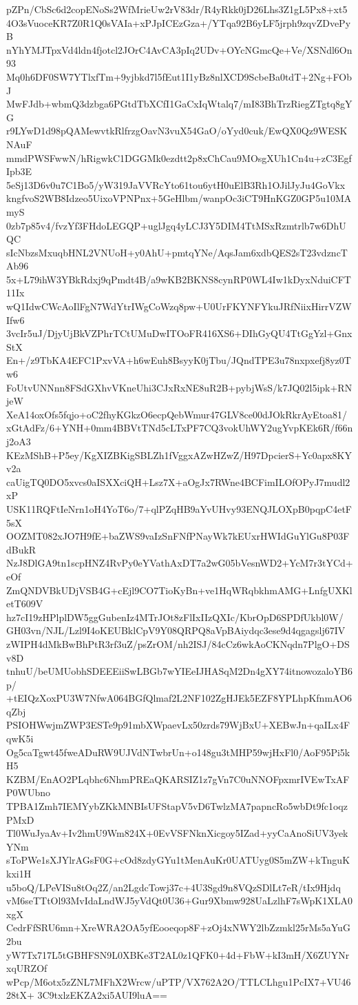 pZPn/CbSc6d2copENoSs2WfMrieUw2rV83dr/R4yRkk0jD26Lhs3Z1gL5Px8+xt5
4O3sVuoceKR7Z0R1Q0sVAIa+xPJpICEzGza+/YTqa92B6yLF5jrph9zqvZDvePyB
nYhYMJTpxVd4ldn4fjotcl2JOrC4AvCA3pIq2UDv+OYcNGmcQe+Ve/XSNdl6On93
Mq0h6DF0SW7YTlxfTm+9yjbkd7l5fEut1I1yBz8nlXCD9ScbeBa0tdT+2Ng+FObJ
MwFJdb+wbmQ3dzbga6PGtdTbXCfI1GaCxIqWtalq7/mI83BhTrzRiegZTgtq8gYG
r9LYwD1d98pQAMewvtkRlfrzgOavN3vuX54GaO/oYyd0cuk/EwQX0Qz9WESKNAuF
mmdPWSFwwN/hRigwkC1DGGMk0ezdtt2p8xChCau9MOsgXUh1Cn4u+zC3EgfIpb3E
5eSj13D6v0u7C1Bo5/yW319JaVVRcYto61tou6ytH0uElB3Rh1OJilJyJu4GoVkx
kngfvoS2WB8Idzeo5UixoVPNPnx+5GeHlbm/wanpOc3iCT9HnKGZ0GP5u10MAmyS
0zb7p85v4/fvzYf3FHdoLEGQP+uglJgq4yLCJ3Y5DIM4TtMSxRzmtrlb7w6DhUQC
sIcNbzsMxuqbHNL2VNUoH+y0AhU+pmtqYNe/AqsJam6xdbQES2sT23vdzncTAb96
5x+L79ihW3YBkRdxj9qPmdt4B/a9wKB2BKNS8cynRP0WL4Iw1kDyxNduiCFT11Ix
wQ1IdwCWcAoIlFgN7WdYtrIWgCoWzq8pw+U0UrFKYNFYkuJRfNiixHirrVZWIfw6
3vcIr5uJ/DjyUjBkVZPhrTCtUMuDwITOoFR416XS6+DIhGyQU4TtGgYzl+GnxStX
En+/z9TbKA4EFC1PxvVA+h6wEuh8BsyyK0jTbu/JQndTPE3u78nxpxefj8yz0Tw6
FoUtvUNNnn8FSdGXhvVKneUhi3CJxRxNE8uR2B+pybjWsS/k7JQ02l5ipk+RNjeW
XeA14oxOfs5fqjo+oC2fhyKGkzO6ecpQebWmur47GLV8ce00dJOkRkrAyEtoa81/
xGtAdFz/6+YNH+0mm4BBVtTNd5cLTxPF7CQ3vokUhWY2ugYvpKEk6R/f66nj2oA3
KEzMShB+P5ey/KgXIZBKigSBLZh1fVggxAZwHZwZ/H97DpcierS+Yc0apx8KYv2a
caUigTQ0DO5xvcs0aISXXciQH+Lsz7X+aOgJx7RWne4BCFimILOfOPyJ7mudl2xP
USK11RQFtIeNrn1oH4YoT6o/7+qlPZqHB9aYvUHvy93ENQJLOXpB0pqpC4etF5sX
OOZMT082xJO7H9fE+baZWS9vaIzSnFNfPNayWk7kEUxrHWIdGuYlGu8P03FdBukR
NzJ8DlGA9tn1scpHNZ4RvPy0eYVathAxDT7a2wG05bVesnWD2+YcM7r3tYCd+eOf
ZmQNDVBkUDjVSB4G+cEjl9CO7TioKyBn+ve1HqWRqbkhmAMG+LnfgUXKletT609V
hz7cI19zHPlplDW5ggGubenIz4MTrJOt8zFlIxIIzQXIc/KbrOpD6SPDfUkbl0W/
GH03vn/NJL/Lzl9I4oKEUBklCpV9Y08QRPQ8aVpBAiydqc3ese9d4qgagslj67IV
zWIPH4dMkBwBhPtR3rf3uZ/psZrOM/nh2ISJ/84cCz6wkAoCKNqdn7PlgO+DSv8D
tnhuU/beUMUobhSDEEEiiSwLBGb7wYIEeIJHASqM2Dn4gXY74itnowozaloYB6p/
+tEIQzXoxPU3W7NfwA064BGfQlmaf2L2NF102ZgHJEk5EZF8YPLhpKfnmAO6qZbj
PSIOHWwjmZWP3ESTe9p91mbXWpaevLx50zrds79WjBxU+XEBwJn+qaILx4FqwK5i
Og5caTgwt45fweADuRW9UJVdNTwbrUn+o148gu3tMHP59wjHxFl0/AoF95Pi5kH5
KZBM/EnAO2PLqbhc6NhmPREaQKARSIZ1z7gVn7C0uNNOFpxmrIVEwTxAFP0WUbno
TPBA1Zmh7IEMYybZKkMNBIsUFStapV5vD6TwlzMA7papncRo5wbDt9fc1oqzPMxD
Tl0WuJyaAv+Iv2hmU9Wm824X+0EvVSFNknXicgoy5IZad+yyCaAnoSiUV3yekYNm
sToPWe1sXJYlrAGsF0G+cOd8zdyGYu1tMenAuKr0UATUyg0S5mZW+kTnguKkxi1H
u5boQ/LPeVISu8tOq2Z/an2LgdcTowj37c+4U3Sgd9n8VQzSDlLt7eR/tIx9Hjdq
vM6seTTtOl93MvIdaLndWJ5yVdQt0U36+Gur9Xbmw928UaLzlhF7sWpK1XLA0xgX
CedrFfSRU6mn+XreWRA2OA5yfEooeqop8F+zOj4xNWY2lbZzmkl25rMs5aYuG2bu
yW7Tx717L5tGBHFSN9L0XBKe3T2AL0z1QFK0+4d+FbW+kI3mH/X6ZUYNrxqURZOf
wPcp/M6otx5zZNL7MFhX2Wrcw/uPTP/VX762A2O/TTLCLhgu1PcIX7+VU4628tX+
3C9txlzEKZA2xi5AUI9luA==
